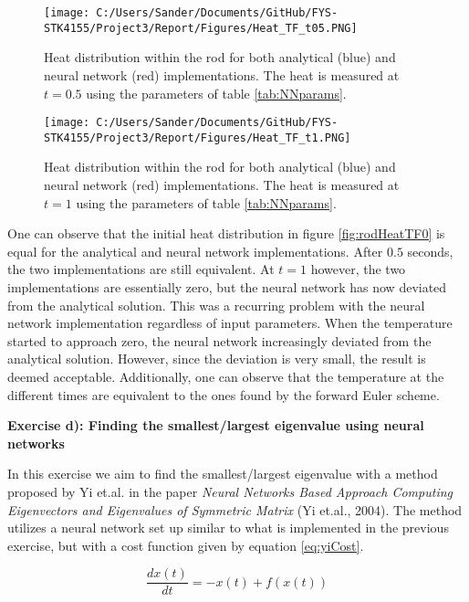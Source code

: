 \documentclass[12pt,a4paper]{article}
\begin{document}
\begin{figure}[H]
\centering
\texttt{[image: C:/Users/Sander/Documents/GitHub/FYS-STK4155/Project3/Report/Figures/Heat\_TF\_t05.PNG]}
\caption{\label{fig:rodHeatTF05} Heat distribution within the rod for both analytical (blue) and neural network (red) implementations. The heat is measured at $t = 0.5$ using the parameters of table \ref{tab:NNparams}.}
\end{figure}

\begin{figure}[H]
\centering
\texttt{[image: C:/Users/Sander/Documents/GitHub/FYS-STK4155/Project3/Report/Figures/Heat\_TF\_t1.PNG]}
\caption{\label{fig:rodHeatTF1} Heat distribution within the rod for both analytical (blue) and neural network (red) implementations. The heat is measured at $t = 1$ using the parameters of table \ref{tab:NNparams}.}
\end{figure}

\noindent One can observe that the initial heat distribution in figure \ref{fig:rodHeatTF0} is equal for the analytical and neural network implementations. After $0.5$ seconds, the two implementations are still equivalent. At $t = 1$ however, the two implementations are essentially zero, but the neural network has now deviated from the analytical solution. This was a recurring problem with the neural network implementation regardless of input parameters. When the temperature started to approach zero, the neural network increasingly deviated from the analytical solution. However, since the deviation is very small, the result is deemed acceptable. Additionally, one can observe that the temperature at the different times are equivalent to the ones found by the forward Euler scheme.

\newpage

\begin{center}
\Large{\textbf{Exercise d): Finding the smallest/largest eigenvalue using neural networks}}
\end{center}

\noindent In this exercise we aim to find the smallest/largest eigenvalue with a method proposed by Yi et.al. in the paper \emph{Neural Networks Based Approach Computing Eigenvectors and Eigenvalues of Symmetric Matrix} (Yi et.al., 2004). The method utilizes a neural network set up similar to what is implemented in the previous exercise, but with a cost function given by equation \ref{eq:yiCost}.

\begin{equation}\label{eq:yiCost}
\frac{d x(t)}{dt} = -x(t) + f(x(t))
\end{equation}
\end{document}
